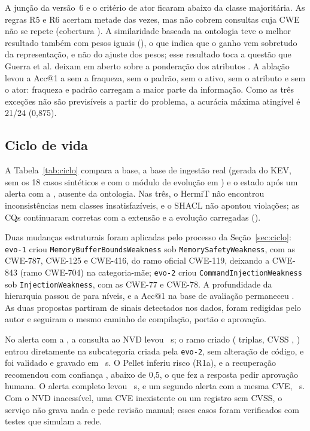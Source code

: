 \documentclass[12pt]{article}
\newcommand{\oc}[1]{\texttt{#1}}
\begin{document}
A junção da versão~6 e o critério de ator ficaram abaixo da classe majoritária. As regras R5 e R6 acertam metade das vezes, mas não cobrem consultas cuja CWE não se repete (cobertura \covRule). A similaridade baseada na ontologia teve o melhor resultado também com pesos iguais (\accEq), o que indica que o ganho vem sobretudo da representação, e não do ajuste dos pesos; esse resultado toca a questão que Guerra et al. deixam em aberto sobre a ponderação dos atributos \cite{guerra2025cases}. A ablação levou a Acc@1 a \ablWeakness{} sem a fraqueza, \ablPattern{} sem o padrão, \ablAsset{} sem o ativo, \ablAttribute{} sem o atributo e \ablActor{} sem o ator: fraqueza e padrão carregam a maior parte da informação. Como as três exceções não são previsíveis a partir do problema, a acurácia máxima atingível é 21/24 (0,875).

\subsection{Ciclo de vida}

A Tabela~\ref{tab:ciclo} compara a base, a base de ingestão real (gerada do KEV, sem os 18 casos sintéticos e com o módulo de evolução em \lcEvoVersion{}) e o estado após um alerta com a \lcCve{}, ausente da ontologia. Nas três, o HermiT não encontrou inconsistências nem classes insatisfazíveis, e o SHACL não apontou violações; as CQs continuaram corretas com a extensão e a evolução carregadas (\lcRegressionCq{}).

\begin{table}[ht]
\centering\small
\caption{Base, ingestão real e tempo real. Tempos de uma execução, com o arranque da máquina virtual Java.}
\label{tab:ciclo}

\end{table}

Duas mudanças estruturais foram aplicadas pelo processo da Seção~\ref{sec:ciclo}: \texttt{evo-1} criou \oc{MemoryBufferBoundsWeakness} sob \oc{MemorySafetyWeakness}, com as CWE-787, CWE-125 e CWE-416, do ramo oficial CWE-119, deixando a CWE-843 (ramo CWE-704) na categoria-mãe; \texttt{evo-2} criou \oc{CommandInjectionWeakness} sob \oc{InjectionWeakness}, com as CWE-77 e CWE-78. A profundidade da hierarquia passou de \lcBaseDepth{} para \lcRealDepth{} níveis, e a Acc@1 na base de avaliação permaneceu \lcBaseAcc{}. As duas propostas partiram de sinais detectados nos dados, foram redigidas pelo autor e seguiram o mesmo caminho de compilação, portão e aprovação.

No alerta com a \lcCve{}, a consulta ao NVD levou \lcNvdSec{}~s; o ramo criado (\lcEnrichTriples{} triplas, CVSS \lcCvss{}, \lcCwe{}) entrou diretamente na subcategoria criada pela \texttt{evo-2}, sem alteração de código, e foi validado e gravado em \lcEnrichSec{}~s. O Pellet inferiu risco \emph{\lcRisk} (R1a), e a recuperação recomendou \oc{\lcAction} com confiança \lcConfidence{}, abaixo de 0,5, o que fez a resposta pedir aprovação humana. O alerta completo levou \lcAlertOneSec{}~s, e um segundo alerta com a mesma CVE, \lcAlertTwoSec{}~s. Com o NVD inacessível, uma CVE inexistente ou um registro sem CVSS, o serviço não grava nada e pede revisão manual; esses casos foram verificados com testes que simulam a rede.
\end{document}
